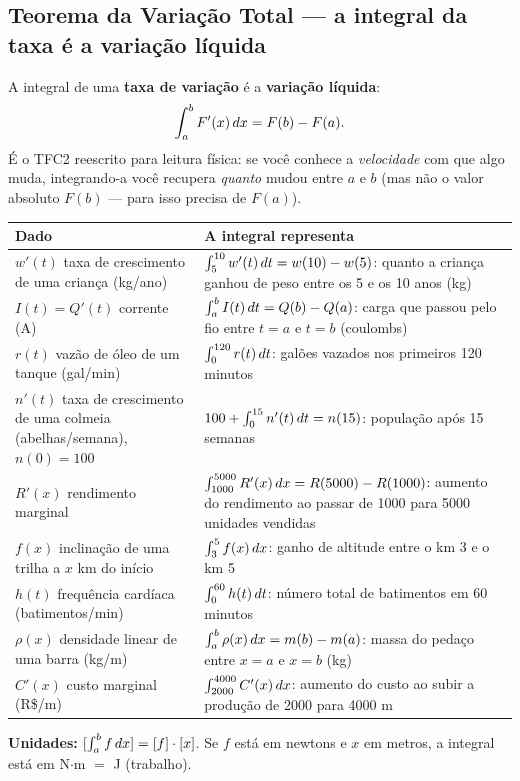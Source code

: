 \subsection{Teorema da Variação Total --- a integral da taxa é a variação líquida}

\begin{definicao}
A integral de uma \textbf{taxa de variação} é a \textbf{variação líquida}:
\[
\int_a^b F'(x)\,dx=F(b)-F(a).
\]
É o TFC2 reescrito para leitura física: se você conhece a \emph{velocidade} com que algo muda, integrando-a você recupera \emph{quanto} mudou entre $a$ e $b$ (mas não o valor absoluto $F(b)$ --- para isso precisa de $F(a)$).
\end{definicao}

\begin{definicao}
\small
\begin{tabular}{@{}>{\raggedright\arraybackslash}p{5.0cm}>{\raggedright\arraybackslash}p{10.5cm}@{}}
\toprule
\textbf{Dado} & \textbf{A integral representa}\\
\midrule
$w'(t)$ taxa de crescimento de uma criança (kg/ano) & $\int_5^{10}w'(t)\,dt=w(10)-w(5)$: quanto a criança ganhou de peso entre os 5 e os 10 anos (kg)\\
$I(t)=Q'(t)$ corrente (A) & $\int_a^b I(t)\,dt=Q(b)-Q(a)$: carga que passou pelo fio entre $t=a$ e $t=b$ (coulombs)\\
$r(t)$ vazão de óleo de um tanque (gal/min) & $\int_0^{120}r(t)\,dt$: galões vazados nos primeiros 120 minutos\\
$n'(t)$ taxa de crescimento de uma colmeia (abelhas/semana), $n(0)=100$ & $100+\int_0^{15}n'(t)\,dt=n(15)$: população após 15 semanas\\
$R'(x)$ rendimento marginal & $\int_{1000}^{5000}R'(x)\,dx=R(5000)-R(1000)$: aumento do rendimento ao passar de 1000 para 5000 unidades vendidas\\
$f(x)$ inclinação de uma trilha a $x$ km do início & $\int_3^5 f(x)\,dx$: ganho de altitude entre o km 3 e o km 5\\
$h(t)$ frequência cardíaca (batimentos/min) & $\int_0^{60}h(t)\,dt$: número total de batimentos em 60 minutos\\
$\rho(x)$ densidade linear de uma barra (kg/m) & $\int_a^b\rho(x)\,dx=m(b)-m(a)$: massa do pedaço entre $x=a$ e $x=b$ (kg)\\
$C'(x)$ custo marginal (R\$/m) & $\int_{2000}^{4000}C'(x)\,dx$: aumento do custo ao subir a produção de 2000 para 4000 m\\
\bottomrule
\end{tabular}

\smallskip
\textbf{Unidades:} $[\int_a^b f\,dx]=[f]\cdot[x]$. Se $f$ está em newtons e $x$ em metros, a integral está em N$\cdot$m $=$ J (trabalho).
\end{definicao}

